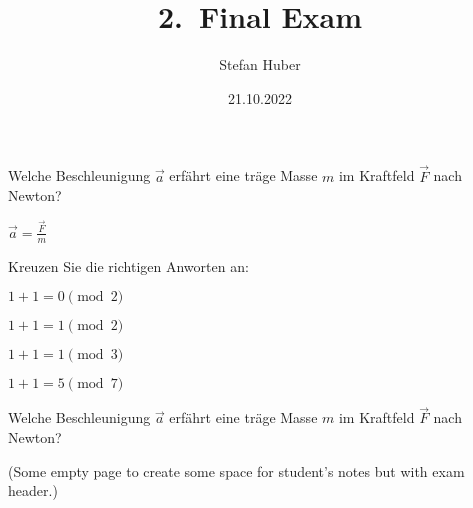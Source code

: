 \documentclass[twoside,exam,showanswers]{exsheet2}
\title{2.\ Final Exam}
\date{21.10.2022}
\author{Stefan Huber}
\institute{Department IT}
\begin{document}
\maketitle


\begin{exercise}[6]
  Welche Beschleunigung $\vec{a}$ erfährt eine träge Masse $m$ im Kraftfeld
  $\vec{F}$ nach Newton?
  \vspace{2cm}
\end{exercise}

\begin{answer}
  $\vec{a} = \frac{\vec{F}}{m}$
\end{answer}


\begin{exercise}[4]
  Kreuzen Sie die richtigen Anworten an:
  \begin{choices}
    \item $1 + 1 = 0 \pmod 2$
    \item $1 + 1 = 1 \pmod 2$
    \item $1 + 1 = 1 \pmod 3$
    \item $1 + 1 = 5 \pmod 7$
  \end{choices}
\end{exercise}


\begin{exercise}[1]
  Welche Beschleunigung $\vec{a}$ erfährt eine träge Masse $m$ im Kraftfeld
  $\vec{F}$ nach Newton?
  \vspace{2cm}
\end{exercise}


\newpage\null
(Some empty page to create some space for student's notes but with exam header.)
\newpage\null
\end{document}
